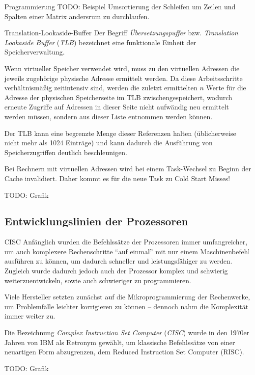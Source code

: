 \begin{example}{Programmierung}
    TODO: Beispiel Umsortierung der Schleifen um Zeilen und Spalten einer Matrix andersrum zu durchlaufen.
\end{example}

\begin{defi}{Translation-Lookaside-Buffer}
    Der Begriff \emph{Übersetzungspuffer} bzw. \emph{Translation Lookaside Buffer} (\emph{TLB}) bezeichnet eine funktionale Einheit der Speicherverwaltung.
    
    Wenn virtueller Speicher verwendet wird, muss zu den virtuellen Adressen die jeweils zugehörige physische Adresse ermittelt werden.
    Da diese Arbeitsschritte verhältnismäßig zeitintensiv sind, werden die zuletzt ermittelten $n$ Werte für die Adresse der physischen Speicherseite im TLB zwischengespeichert, wodurch erneute Zugriffe auf Adressen in dieser Seite nicht aufwändig neu ermittelt werden müssen, sondern aus dieser Liste entnommen werden können.
    
    Der TLB kann eine begrenzte Menge dieser Referenzen halten (üblicherweise nicht mehr als 1024 Einträge) und kann dadurch die Ausführung von Speicherzugriffen deutlich beschleunigen.
    
    Bei Rechnern mit virtuellen Adressen wird bei einem Task-Wechsel zu Beginn der Cache invalidiert.
    Daher kommt es für die neue Task zu Cold Start Misses!
    
    TODO: Grafik
\end{defi}

\subsection{Entwicklungslinien der Prozessoren}\label{subsec:entwicklungslinien-der-prozessoren}

\begin{defi}[Befehlssatzarchitektur]{CISC}
    Anfänglich wurden die Befehlssätze der Prozessoren immer umfangreicher, um auch komplexere Rechenschritte \enquote{auf einmal} mit nur einem Maschinenbefehl ausführen zu können, 
    um dadurch schneller und leistungsfähiger zu werden.
    Zugleich wurde dadurch jedoch auch der Prozessor komplex und schwierig weiterzuentwickeln, sowie auch schwieriger zu programmieren.
    
    Viele Hersteller setzten zunächst auf die Mikroprogrammierung der Rechenwerke, um Problemfälle leichter korrigieren zu können -- dennoch nahm die Komplexität immer weiter zu.
    
    Die Bezeichnung \emph{Complex Instruction Set Computer} (\emph{CISC}) wurde in den 1970er Jahren von IBM als Retronym gewählt, um klassische Befehlssätze von einer neuartigen Form abzugrenzen, dem Reduced Instruction Set Computer (RISC).
    
    TODO: Grafik
\end{defi}

